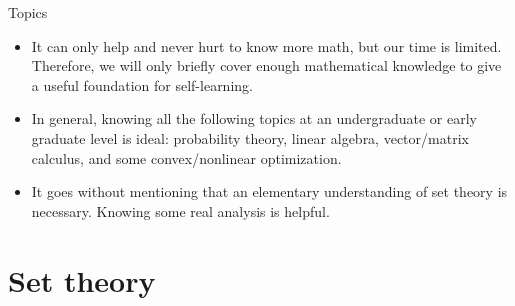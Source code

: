 \documentclass{beamer}
\begin{document}
\begin{frame}{Topics}
    \begin{itemize}
        \item
        It can only help and never hurt to know more
        math\footnotemark{}, but our time is
        limited. Therefore, we will only briefly cover enough mathematical
        knowledge to give a useful foundation for self-learning.

        \item
        In general, knowing all the following topics at an undergraduate or
        early graduate level is ideal: probability theory, linear algebra,
        vector/matrix calculus, and some convex/nonlinear optimization.

        \item
        It goes without mentioning that an elementary understanding of set
        theory is necessary. Knowing some real analysis is helpful.
    \end{itemize}
\end{frame}

\section{Set theory}
\end{document}
